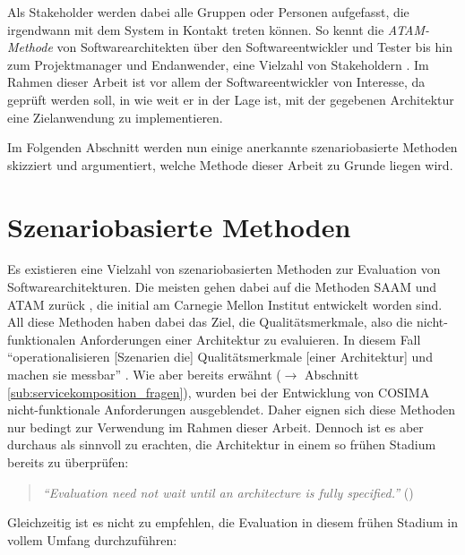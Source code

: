   Als Stakeholder werden dabei alle Gruppen oder Personen aufgefasst, die irgendwann mit dem System in Kontakt treten können. So kennt die \emph{ATAM-Methode} von Softwarearchitekten über den Softwareentwickler und Tester bis hin zum Projektmanager und Endanwender, eine Vielzahl von Stakeholdern \citep[S. 63ff]{evaluating_software_architectures}. Im Rahmen dieser Arbeit ist vor allem der Softwareentwickler von Interesse, da geprüft werden soll, in wie weit er in der Lage ist, mit der gegebenen Architektur eine Zielanwendung zu implementieren.
  
  Im Folgenden Abschnitt werden nun einige anerkannte szenariobasierte Methoden skizziert und argumentiert, welche Methode dieser Arbeit zu Grunde liegen wird.

  
\section{Szenariobasierte Methoden} %
\label{sec:szenariobasierte_methoden}

  Es existieren eine Vielzahl von szenariobasierten Methoden zur Evaluation von Softwarearchitekturen. Die meisten gehen dabei auf die Methoden SAAM und ATAM zurück \citep[S. 1]{scenario_based_software_architecture_evaluation_methods}, die initial am Carnegie Mellon Institut entwickelt worden sind. All diese Methoden haben dabei das Ziel, die Qualitätsmerkmale, also die nicht-funktionalen Anforderungen einer Architektur zu evaluieren. In diesem Fall "`operationalisieren [Szenarien die] Qualitätsmerkmale [einer Architektur] und machen sie messbar"' \citep[S. 61]{effektive_software_architekturen}. Wie aber bereits erwähnt ($\to$ Abschnitt \ref{sub:servicekomposition_fragen}), wurden bei der Entwicklung von COSIMA nicht-funktionale Anforderungen ausgeblendet. Daher eignen sich diese Methoden nur bedingt zur Verwendung im Rahmen dieser Arbeit. Dennoch ist es aber durchaus als sinnvoll zu erachten, die Architektur in einem so frühen Stadium bereits zu überprüfen:
  
  \begin{quote}
    \emph{"`Evaluation need not wait until an architecture is fully specified."'} (\citep[S. 24]{evaluating_software_architectures})
  \end{quote}
  
  Gleichzeitig ist es nicht zu empfehlen, die Evaluation in diesem frühen Stadium in vollem Umfang durchzuführen:
  
